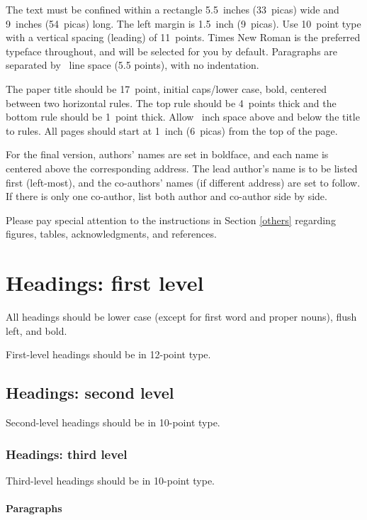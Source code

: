 \documentclass{article}
\begin{document}
The text must be confined within a rectangle 5.5~inches (33~picas)
wide and 9~inches (54~picas) long. The left margin is 1.5~inch
(9~picas).  Use 10~point type with a vertical spacing (leading) of
11~points.  Times New Roman is the preferred typeface throughout, and
will be selected for you by default.  Paragraphs are separated by
~line space (5.5 points), with no indentation.

The paper title should be 17~point, initial caps/lower case, bold,
centered between two horizontal rules. The top rule should be 4~points
thick and the bottom rule should be 1~point thick. Allow
~inch space above and below the title to rules. All
pages should start at 1~inch (6~picas) from the top of the page.

For the final version, authors' names are set in boldface, and each
name is centered above the corresponding address. The lead author's
name is to be listed first (left-most), and the co-authors' names (if
different address) are set to follow. If there is only one co-author,
list both author and co-author side by side.

Please pay special attention to the instructions in Section \ref{others}
regarding figures, tables, acknowledgments, and references.

\section{Headings: first level}
\label{headings}

All headings should be lower case (except for first word and proper
nouns), flush left, and bold.

First-level headings should be in 12-point type.

\subsection{Headings: second level}

Second-level headings should be in 10-point type.

\subsubsection{Headings: third level}

Third-level headings should be in 10-point type.

\paragraph{Paragraphs}
\end{document}
